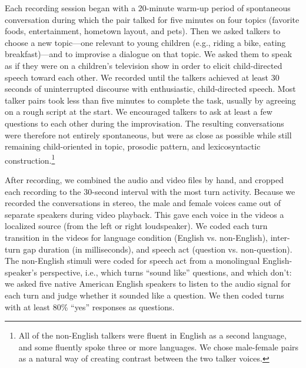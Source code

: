 \documentclass[authoryear, 12pt]{elsarticle}
\begin{document}
Each recording session began with a 20-minute warm-up period of spontaneous conversation during which the pair talked for five minutes on four topics (favorite foods, entertainment, hometown layout, and pets). Then we asked talkers to choose a new topic---one relevant to young children (e.g., riding a bike, eating breakfast)---and to improvise a dialogue on that topic. We asked them to speak as if they were on a children's television show in order to elicit child-directed speech toward each other. We recorded until the talkers achieved at least 30 seconds of uninterrupted discourse with enthusiastic, child-directed speech. Most talker pairs took less than five minutes to complete the task, usually by agreeing on a rough script at the start. We encouraged talkers to ask at least a few questions to each other during the improvisation. The resulting conversations were therefore not entirely spontaneous, but were as close as possible while still remaining child-oriented in topic, prosodic pattern, and lexicosyntactic construction.\footnote{All of the non-English talkers were fluent in English as a second language, and some fluently spoke three or more languages. We chose male-female pairs as a natural way of creating contrast between the two talker voices.}

After recording, we combined the audio and video files by hand, and cropped each recording to the 30-second interval with the most turn activity. Because we recorded the conversations in stereo, the male and female voices came out of separate speakers during video playback. This gave each voice in the videos a localized source (from the left or right loudspeaker). We coded each turn transition in the videos for language condition (English vs. non-English), inter-turn gap duration (in milliseconds), and speech act (question vs. non-question). The non-English stimuli were coded for speech act from a monolingual English-speaker's perspective, i.e., which turns ``sound like'' questions, and which don't: we asked five native American English speakers to listen to the audio signal for each turn and judge whether it sounded like a question. We then coded turns with at least 80\% ``yes'' responses as questions.
\end{document}
